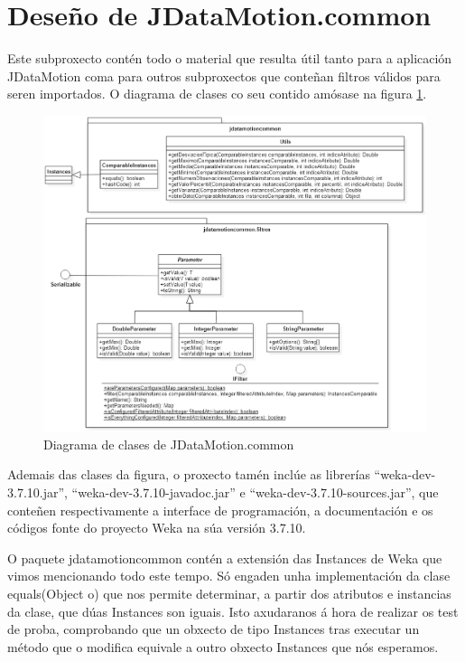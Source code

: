 \section{Deseño de JDataMotion.common}

Este subproxecto contén todo o material que resulta útil tanto para a aplicación JDataMotion coma para outros subproxectos que conteñan filtros válidos para seren importados. O diagrama de clases co seu contido amósase na figura \ref{JDataMotioncommon}.

\begin{figure}
\centering
\includegraphics[width=\textwidth,height=\textheight,keepaspectratio]{figuras/JDataMotioncommon}
\caption{Diagrama de clases de JDataMotion.common}
\label{JDataMotioncommon}
\end{figure}

Ademais das clases da figura, o proxecto tamén inclúe as librerías ``weka-dev-3.7.10.jar'', ``weka-dev-3.7.10-javadoc.jar'' e ``weka-dev-3.7.10-sources.jar'', que conteñen respectivamente a interface de programación, a documentación e os códigos fonte do proyecto Weka na súa versión 3.7.10.

O paquete jdatamotioncommon contén a extensión das Instances de Weka que vimos mencionando todo este tempo. Só engaden unha implementación da clase equals(Object o) que nos permite determinar, a partir dos atributos e instancias da clase, que dúas Instances son iguais. Isto axudaranos á hora de realizar os test de proba, comprobando que un obxecto de tipo Instances tras executar un método que o modifica equivale a outro obxecto Instances que nós esperamos.

